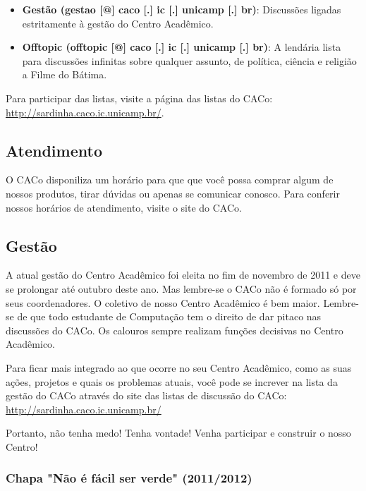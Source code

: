 \begin{itemize}
\item  \textbf{Gestão (gestao [@] caco [.] ic [.] unicamp [.] br)}: Discussões ligadas estritamente à gestão do Centro Acadêmico.
\end{itemize}

\begin{itemize}
\item  \textbf{Offtopic (offtopic [@] caco [.] ic [.] unicamp [.] br)}: A lendária lista para discussões infinitas sobre qualquer assunto, de política, ciência e religião a Filme do Bátima.
\end{itemize}

Para participar das listas, visite a página das listas do CACo:
\url{http://sardinha.caco.ic.unicamp.br/}.

\subsection{Atendimento}

O CACo disponiliza um horário para que que você possa comprar algum de nossos
produtos, tirar dúvidas ou apenas se comunicar conosco. Para conferir nossos
horários de atendimento, visite o site do CACo.

\subsection{Gestão}

A atual gestão do Centro Acadêmico foi eleita no fim de novembro de 2011 e deve
se prolongar até outubro deste ano. Mas lembre-se o CACo não é formado só por
seus coordenadores. O coletivo de nosso Centro Acadêmico é bem maior. Lembre-se
de que todo estudante de Computação tem o direito de dar pitaco nas discussões
do CACo. Os calouros sempre realizam funções decisivas no Centro Acadêmico.

Para ficar mais integrado ao que ocorre no seu Centro Acadêmico, como as suas
ações, projetos e quais os problemas atuais, você pode se increver na lista da
gestão do CACo através do site das listas de discussão do CACo:
\url{http://sardinha.caco.ic.unicamp.br/}

Portanto, não tenha medo! Tenha vontade! Venha participar e construir o nosso
Centro!

\subsubsection{Chapa "Não é fácil ser verde" (2011/2012)}

